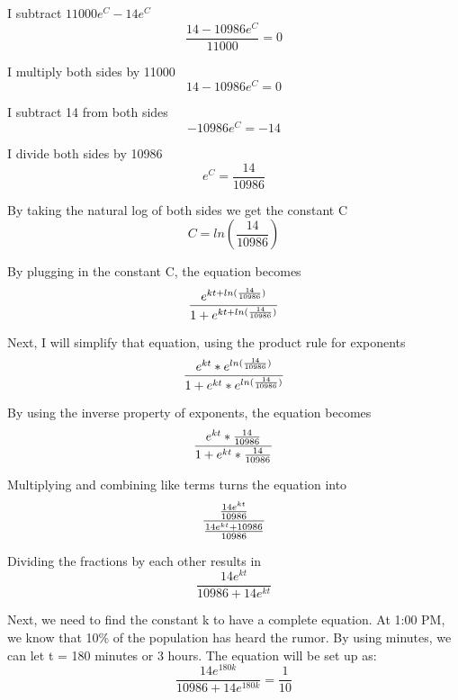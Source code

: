 \documentclass[12pt]{article}
\begin{document}
I subtract $11000e^C - 14e^C$
\begin{equation*}
\frac{14-10986e^C}{11000} = 0
\end{equation*}

I multiply both sides by 11000
\begin{equation*}
14-10986e^C = 0
\end{equation*}

I subtract 14 from both sides
\begin{equation*}
-10986e^C = -14
\end{equation*}

I divide both sides by 10986
\begin{equation*}
e^C = \frac{14}{10986}
\end{equation*}

By taking the natural log of both sides we get the constant C
\begin{equation*}
C = ln(\frac{14}{10986})
\end{equation*}

By plugging in the constant C, the equation becomes
\begin{equation*}
\Large \frac{e^{kt + ln(\frac{14}{10986})}}{1 + e^{kt + ln(\frac{14}{10986})}} 
\end{equation*}

Next, I will simplify that equation, using the product rule for exponents
\begin{equation*}
\Large \frac{e^{kt} * e^{ln(\frac{14}{10986})}}{1 + e^{kt} * e^{ln(\frac{14}{10986})}} 
\end{equation*}

By using the inverse property of exponents, the equation becomes
\begin{equation*}
\Large \frac{e^{kt} * \frac{14}{10986}}{1 + e^{kt} * \frac{14}{10986}} 
\end{equation*}

Multiplying and combining like terms turns the equation into
\begin{equation*}
\Large \frac{\frac{14e^{kt}}{10986}}{\frac{14e^{kt} + 10986}{10986}} 
\end{equation*}

Dividing the fractions by each other results in
\begin{equation*}
\frac{14e^{kt}}{10986+14e^{kt}} 
\end{equation*}

Next, we need to find the constant k to have a complete equation. At 1:00 PM, we know that 10\% of the population has heard the rumor. By using minutes, we can let t = 180 minutes or 3 hours. The equation will be set up as:
\begin{equation*}
\frac{14e^{180k}}{10986+14e^{180k}} = \frac{1}{10}
\end{equation*}
\end{document}
